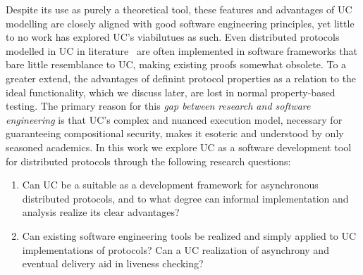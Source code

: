 Despite its use as purely a theoretical tool, these features and advantages of UC modelling are closely aligned with good software engineering principles, yet little to no work has explored UC's viabilutues as such.
Even distributed protocols modelled in UC in literature~\cite{some of them} are often implemented in software frameworks that bare little resemblance to UC, making existing proofs somewhat obsolete. 
To a greater extend, the advantages of definint protocol properties as a relation to the ideal functionality, which we discuss later, are lost in normal property-based testing. 
The primary reason for this \emph{gap between research and software engineering} is that UC's complex and nuanced execution model, necessary for guaranteeing compositional security, makes it esoteric and understood by only seasoned academics. 
In this work we explore UC as a software development tool for distributed protocols through the following research questions:
\begin{enumerate}[label=(RQ\arabic*).,leftmargin=*]
\item Can UC be a suitable as a development framework for asynchronous distributed protocols, and to what degree can informal implementation and analysis realize its clear advantages?
\item Can existing software engineering tools be realized and simply applied to UC implementations of protocols? Can a UC realization of asynchrony and eventual delivery aid in liveness checking?
\end{enumerate}

